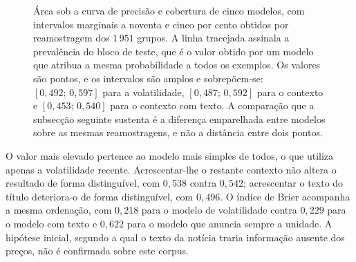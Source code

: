 \begin{figure}[ht]
\centering
{}
\caption[Triagem: pontos e intervalos sobre o mesmo bloco de teste]{Área sob a curva de precisão e
cobertura de cinco modelos, com intervalos marginais a noventa e cinco por cento obtidos por
reamostragem dos $1\,951$ grupos. A linha tracejada assinala a prevalência do bloco de teste, que é o valor
obtido por um modelo que atribua a mesma probabilidade a todos os exemplos. Os valores são pontos, e
os intervalos são amplos e sobrepõem-se: $[0{,}492;\,0{,}597]$ para a volatilidade, $[0{,}487;\,0{,}592]$ para o
contexto e $[0{,}453;\,0{,}540]$ para o contexto com texto. A comparação que a subsecção seguinte
sustenta é a diferença emparelhada entre modelos sobre as mesmas reamostragens, e não a distância
entre dois pontos.}
\label{fig:av_triagem}
\end{figure}


O valor mais elevado pertence ao modelo mais simples de todos, o que utiliza apenas a volatilidade
recente. Acrescentar-lhe o restante contexto não altera o resultado de forma distinguível, com
$0{,}538$ contra $0{,}542$; acrescentar o texto do título deteriora-o de forma distinguível, com
$0{,}496$. O índice de Brier acompanha a mesma ordenação, com $0{,}218$ para o modelo de
volatilidade contra $0{,}229$ para o modelo com texto e $0{,}622$ para o modelo que anuncia sempre a
unidade. A hipótese inicial, segundo a qual o texto da notícia traria informação ausente dos preços,
não é confirmada sobre este corpus.

